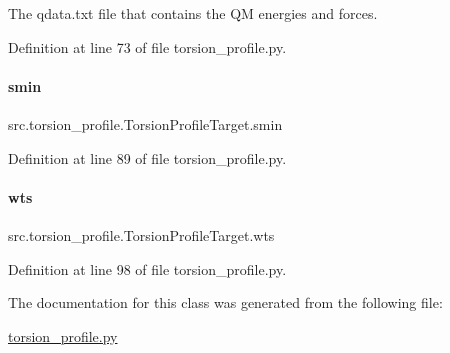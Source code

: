 The qdata.\+txt file that contains the QM energies and forces. 



Definition at line 73 of file torsion\+\_\+profile.\+py.

\mbox{\label{classsrc_1_1torsion__profile_1_1TorsionProfileTarget_a68645067dfaf9262844abe68c4ecacb6}} 
\paragraph{\texorpdfstring{smin}{smin}}
{\footnotesize\ttfamily src.\+torsion\+\_\+profile.\+Torsion\+Profile\+Target.\+smin}



Definition at line 89 of file torsion\+\_\+profile.\+py.

\mbox{\label{classsrc_1_1torsion__profile_1_1TorsionProfileTarget_a712ce3fdf7f20114d54f59d79d97ede0}} 
\paragraph{\texorpdfstring{wts}{wts}}
{\footnotesize\ttfamily src.\+torsion\+\_\+profile.\+Torsion\+Profile\+Target.\+wts}



Definition at line 98 of file torsion\+\_\+profile.\+py.



The documentation for this class was generated from the following file\+:\begin{DoxyCompactItemize}
\item 
\hyperlink{torsion__profile_8py}{torsion\+\_\+profile.\+py}\end{DoxyCompactItemize}
